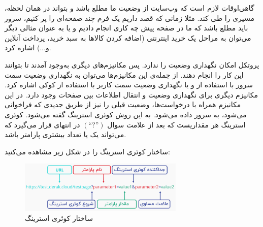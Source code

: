‏گاهی‌اوقات لازم است که وب‌سایت از وضعیت
\noindent\unskip{}
ما مطلع باشد و بتواند در همان لحظه، مسیری را طی کند. مثلا زمانی که قصد داریم یک فرم چند صفحه‌ای را پر کنیم، سرور باید مطلع باشد که ما در صفحه پیش چه کاری انجام دادیم و یا به عنوان مثالی دیگر می‌توان به مراحل یک خرید اینترنتی (اضافه کردن کالاها به سبد خرید، پرداخت آنلاین و...) اشاره کرد.

پروتکل
امکان نگهداری وضعیت را ندارد. پس مکانیزم‌های دیگری به‌وجود آمدند تا بتوانند این کار را انجام دهند. از جمله‌ی این مکانیزم‌ها می‌توان به نگهداری وضعیت سمت سرور با استفاده از 
و یا نگهداری وضعیت سمت کاربر
\noindent\unskip{}
با استفاده از کوکی
\noindent\unskip{}
اشاره کرد.
مکانیزم دیگری برای نگهداری وضعیت و انتقال اطلاعات بين صفحات وجود دارد. در این مکانیزم همراه با درخواست‌ها، وضعیت قبلی را نیز از طریق
جدیدی که فراخوانی می‌شود، به سرور داده می‌شود. به این روش کوئری استرینگ گفته می‌شود.
\newpage
کوئری استرینگ هر مقداریست که بعد از علامت سوال $(“?”)$ در انتهای
قرار می‌گیرد که می‌تواند یک یا تعداد بیشتری پارامتر باشد.

ساختار کوئری استرینگ را در شکل زیر مشاهده می‌کنید:
\begin{figure}[H]
	\centering
	\includegraphics[width=0.7\textwidth]{./images/Chapter3/QueryStringStructure}	
	\caption[ساختار کوئری استرینگ]{ساختار کوئری استرینگ \cite{QueryString}}
	\label{ساختار کوئری}
\end{figure}
\noindent
\unskip

